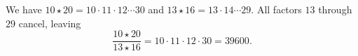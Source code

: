 We have $10\star20=10\cdot11\cdot12\cdots30$ and $13\star16=13\cdot14\cdots29$. All factors $13$ through $29$ cancel, leaving
\[
\dfrac{10\star20}{13\star16}=10\cdot11\cdot12\cdot30=\boxed{39600}.
\]
